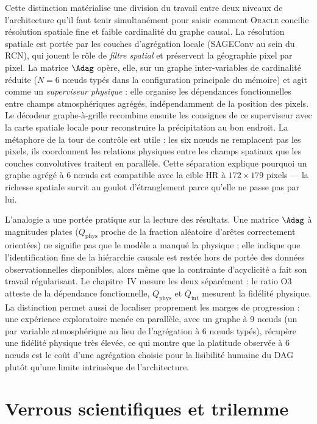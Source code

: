 \documentclass[14pt,a4paper,openany]{extreport}
\newcommand{\Oracle}{\textsc{Oracle}}
\begin{document}
Cette distinction matérialise une division du travail entre deux niveaux de l'architecture qu'il faut tenir simultanément pour saisir comment \Oracle{} concilie résolution spatiale fine et faible cardinalité du graphe causal. La résolution spatiale est portée par les couches d'agrégation locale (SAGEConv au sein du RCN), qui jouent le rôle de \emph{filtre spatial} et préservent la géographie pixel par pixel. La matrice $\Adag$ opère, elle, sur un graphe inter-variables de cardinalité réduite ($N = 6$ nœuds typés dans la configuration principale du mémoire) et agit comme un \emph{superviseur physique} : elle organise les dépendances fonctionnelles entre champs atmosphériques agrégés, indépendamment de la position des pixels. Le décodeur graphe-à-grille recombine ensuite les consignes de ce superviseur avec la carte spatiale locale pour reconstruire la précipitation au bon endroit. La métaphore de la tour de contrôle est utile : les six nœuds ne remplacent pas les pixels, ils coordonnent les relations physiques entre les champs spatiaux que les couches convolutives traitent en parallèle. Cette séparation explique pourquoi un graphe agrégé à 6 nœuds est compatible avec la cible HR à $172 \times 179$ pixels --- la richesse spatiale survit au goulot d'étranglement parce qu'elle ne passe pas par lui.

L'analogie a une portée pratique sur la lecture des résultats. Une matrice $\Adag$ à magnitudes plates ($Q_{\mathrm{phys}}$ proche de la fraction aléatoire d'arêtes correctement orientées) ne signifie pas que le modèle a manqué la physique ; elle indique que l'identification fine de la hiérarchie causale est restée hors de portée des données observationnelles disponibles, alors même que la contrainte d'acyclicité a fait son travail régularisant. Le chapitre~IV mesure les deux séparément : le ratio O3 atteste de la dépendance fonctionnelle, $Q_{\mathrm{phys}}$ et $Q_{\mathrm{int}}$ mesurent la fidélité physique. La distinction permet aussi de localiser proprement les marges de progression : une expérience exploratoire menée en parallèle, avec un graphe à 9 nœuds (un par variable atmosphérique au lieu de l'agrégation à 6 nœuds typés), récupère une fidélité physique très élevée, ce qui montre que la platitude observée à 6 nœuds est le coût d'une agrégation choisie pour la lisibilité humaine du DAG plutôt qu'une limite intrinsèque de l'architecture.

\section{Verrous scientifiques et trilemme}
\label{sec:verrous}
\end{document}
